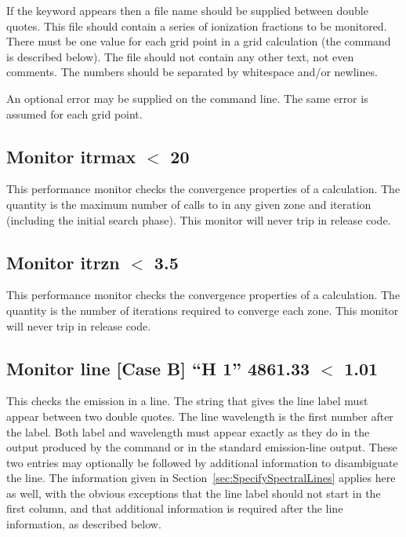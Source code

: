 If the keyword  appears then a file name should be supplied
between double quotes. This file should contain a series of ionization
fractions to be monitored. There must be one value for each grid point in a
grid calculation (the  command is described below). The file
should not contain any other text, not even comments. The numbers should be
separated by whitespace and/or newlines.

An optional error may be supplied on the command line. The same error is
assumed for each grid point.

\subsection{Monitor itrmax $<$ 20}

This performance monitor checks the convergence properties of a calculation.
The quantity is the maximum number of calls to  in any
given zone and iteration (including the initial search phase).
This monitor will never trip in release code.

\subsection{Monitor itrzn $<$ 3.5}

This performance monitor checks the convergence properties of a calculation.
The quantity
is the number of iterations required to converge each zone.
This monitor will never trip in release code.

\subsection{Monitor line [Case B] ``H  1'' 4861.33 $<$ 1.01}

This checks the emission in a line.
The string that gives the line label must appear between
two double quotes.
The line wavelength is the first number after the label.
Both label and wavelength must appear exactly as they do in the output
produced by the  command or
in the standard emission-line output. These two entries may optionally
be followed by additional information to disambiguate the line.
The information given in Section~\ref{sec:SpecifySpectralLines} applies
here as well, with the obvious exceptions that the line label should
not start in the first column, and that additional information is
required after the line information, as described below.

